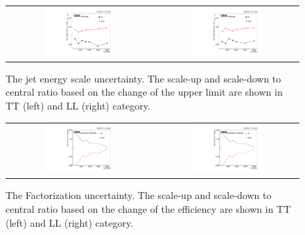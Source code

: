 \begin{itemize}
  \begin{figure}[t]
  \centering
 \begin{tabular}{cc}
    \includegraphics[width=0.5\textwidth]{Figures/plots_uncert/JEC_TT.pdf} &
   \includegraphics[width=0.5\textwidth]{Figures/plots_uncert/JEC_LL.pdf} \\
  \end{tabular}
  \caption{The jet energy scale uncertainty. The scale-up and scale-down to central ratio based on the change of the upper limit are shown in TT (left) and LL (right) category.}

\end{figure} 

 \begin{figure}[t]
  \centering
 \begin{tabular}{cc}
    \includegraphics[width=0.5\textwidth]{Figures/scl/scl_TT.pdf} &
   \includegraphics[width=0.5\textwidth]{Figures/scl/scl_TT.pdf} \\
  \end{tabular}
  \caption{The Factorization uncertainty. The scale-up and scale-down to central ratio based on the change of the efficiency are shown in TT (left) and LL (right) category.}


\end{figure}
\end{itemize}
